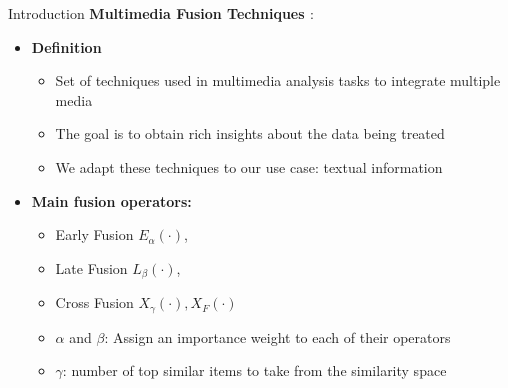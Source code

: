 \documentclass[10pt,xcolor=table]{beamer}
\begin{document}
      
\begin{frame}{Introduction}
\large \textbf{Multimedia Fusion Techniques \cite{AtreyHEK10,ahn2010link}}:
\begin{itemize}
\item \large \textbf{Definition}
	\begin{itemize}
	\item Set of techniques used in multimedia analysis tasks to integrate multiple media 
	\item The goal is to obtain rich insights about the data being treated
	\item We adapt these techniques to our use case: textual information
	\end{itemize}
\item \textbf{Main fusion operators:}
	\begin{itemize}
	\item Early Fusion $E_\alpha(\cdot)$, 
	\item Late Fusion $L_\beta(\cdot)$, 
	\item Cross Fusion $X_\gamma(\cdot), X_F(\cdot)$
	\item $\alpha$ and $\beta$: Assign an importance weight to each of their operators 
	\item $\gamma$: number of top similar items to take from the similarity space
	\end{itemize}

\end{itemize}
\end{frame}
\end{document}
